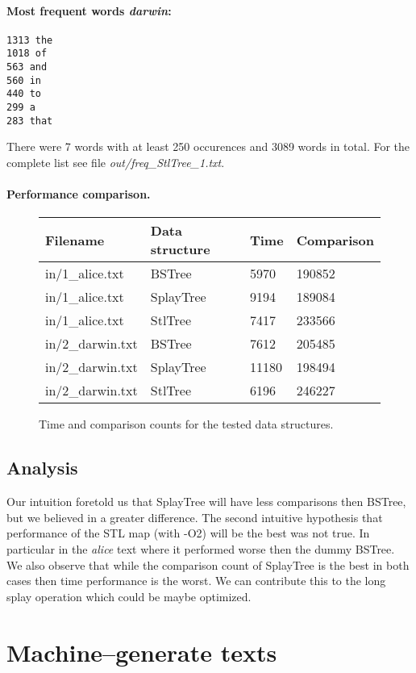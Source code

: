 \documentclass[12pt,a4paper]{article}
\begin{document}
\paragraph{Most frequent words \emph{darwin}:}
\begin{lstlisting}
1313 the
1018 of
563 and
560 in
440 to
299 a
283 that
\end{lstlisting}
There were 7 words with at least 250 occurences and 3089 words in total. 
For the complete list see file \emph{out/freq\_StlTree\_1.txt}. 

\paragraph{Performance comparison.} 
\begin{figure}[h]
  \centering
\begin{tabular}{|l|l|l|l|}
\hline
Filename&Data structure&Time&Comparison\\
\hline
in/1\_alice.txt&BSTree&5970&190852\\
\hline
in/1\_alice.txt&SplayTree&9194&189084\\
\hline
in/1\_alice.txt&StlTree&7417&233566\\
\hline
in/2\_darwin.txt&BSTree&7612&205485\\
\hline
in/2\_darwin.txt&SplayTree&11180&198494\\
\hline
in/2\_darwin.txt&StlTree&6196&246227\\
\hline
\end{tabular}
  \caption{Time and comparison counts for the tested data structures.}
  \label{fig:main_time_cmp}
\end{figure}

\subsection{Analysis} 
Our intuition foretold us that SplayTree will have less comparisons then BSTree, but we believed in a greater difference. The second intuitive hypothesis that performance of the STL map (with -O2) will be the best was not true. In particular in the \emph{alice} text where it performed worse then the dummy BSTree. We also observe that while the comparison count of SplayTree is the best in both cases then time performance is the worst. We can contribute this to the long splay operation which could be maybe optimized. 

\section{Machine--generate texts} 
\end{document}
